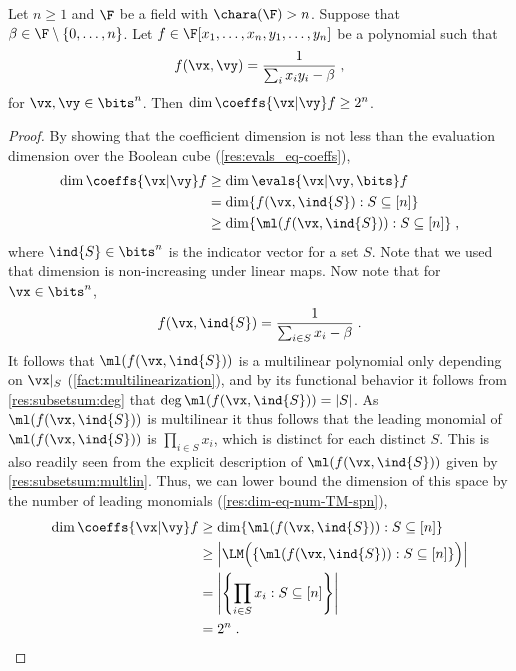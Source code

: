 \documentclass{toc}
\begin{document}
\begin{proposition}\label{res:lbs-fn:dim-eval}
        Let $n\ge 1$ and $\F$ be a field with $\chara(\F)>n$.  Suppose that $\beta\in\F\setminus\{0,\ldots,n\}$.  Let $f\in\F[x_1,\ldots,x_n,y_1,\ldots,y_n]$ be a polynomial such that
        \[
                f(\vx,\vy)=\frac{1}{\sum_i x_iy_i-\beta}
                \;,
        \]
        for $\vx,\vy\in\bits^n$. Then $\dim\coeffs{\vx|\vy} f\ge 2^n$.
\end{proposition}
\begin{proof}
%
%
  By showing that the coefficient dimension is not less than %
  the evaluation dimension
  over the Boolean cube (\autoref{res:evals_eq-coeffs}),
        \begin{align*}
                \dim\coeffs{\vx|\vy} f
                &\ge \dim\evals{\vx|\vy,\bits} f\\
                &=\dim \{f(\vx,\ind{S}) : S\subseteq[n]\}\\
                &\ge\dim \{\ml(f(\vx,\ind{S})) : S\subseteq[n]\}
                \;,
        \end{align*}
where $\ind{S}\in\bits^n$ is the indicator vector for a set $S$. %
%
%
%
%
%
        Note that we used that dimension is non-increasing under linear maps. Now note that for $\vx\in\bits^n$,     %
    \[
                f(\vx,\ind{S})=\frac{1}{\sum_{i\in S} x_i-\beta}
                \;.   %
        \]
        It follows %
that  %
$\ml(f(\vx,\ind{S}))$ is a multilinear polynomial only depending on $\vx|_S$ (\autoref{fact:multilinearization}), and by its functional behavior it follows from \autoref{res:subsetsum:deg} that $\deg \ml(f(\vx,\ind{S}))=|S|$.  As $\ml(f(\vx,\ind{S}))$ is multilinear it thus follows that the leading monomial of $\ml(f(\vx,\ind{S}))$ is $\prod_{i\in S} x_i$, which is distinct for each distinct $S$.  This is also readily seen from the explicit description of $\ml(f(\vx,\ind{S}))$ given by \autoref{res:subsetsum:multlin}.  Thus, we can lower bound the dimension of this space by the number of leading monomials (\autoref{res:dim-eq-num-TM-spn}),
        \begin{align*}
                \dim\coeffs{\vx|\vy} f
                &\ge\dim \{\ml(f(\vx,\ind{S})) : S\subseteq[n]\}\\
                &\ge\left|\LM \Big(\{\ml(f(\vx,\ind{S})) : S\subseteq[n]\}\Big)\right|\\
                &=\left|\left\{\prod_{i\in S} x_i : S\subseteq[n]\right\}\right|\\
                &=2^n
                \;.
                \qedhere
        \end{align*}
\end{proof}
\end{document}
